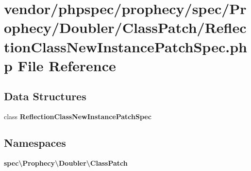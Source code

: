 \section{vendor/phpspec/prophecy/spec/\+Prophecy/\+Doubler/\+Class\+Patch/\+Reflection\+Class\+New\+Instance\+Patch\+Spec.php File Reference}
\label{_reflection_class_new_instance_patch_spec_8php}
\subsection*{Data Structures}
\begin{DoxyCompactItemize}
\item 
class {\bf Reflection\+Class\+New\+Instance\+Patch\+Spec}
\end{DoxyCompactItemize}
\subsection*{Namespaces}
\begin{DoxyCompactItemize}
\item 
 {\bf spec\textbackslash{}\+Prophecy\textbackslash{}\+Doubler\textbackslash{}\+Class\+Patch}
\end{DoxyCompactItemize}
